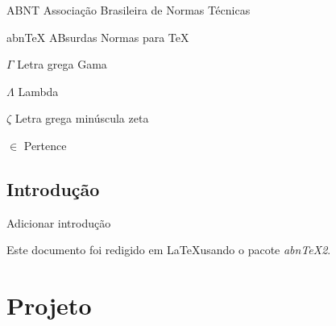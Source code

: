 \documentclass[
12pt,				%
openany,			%
twoside,			%
a4paper,			%
english,			%
french,				%
spanish,			%
brazil,				%
]{abntex2}
\begin{document}
\listoffigures*
\cleardoublepage

\listoftables*
\cleardoublepage

\lstlistoflistings
\cleardoublepage

\begin{siglas}
\item[ABNT] Associação Brasileira de Normas Técnicas
\item[abnTeX] ABsurdas Normas para TeX
\end{siglas}

\begin{simbolos}
\item[$ \Gamma $] Letra grega Gama
\item[$ \Lambda $] Lambda
\item[$ \zeta $] Letra grega minúscula zeta
\item[$ \in $] Pertence
\end{simbolos}

\tableofcontents*
\cleardoublepage


\textual

\chapter*[Introdução]{Introdução}
Adicionar introdução

Este documento foi redigido em \LaTeX usando o pacote \textit{abnTeX2}.
\part{Projeto}
\end{document}
